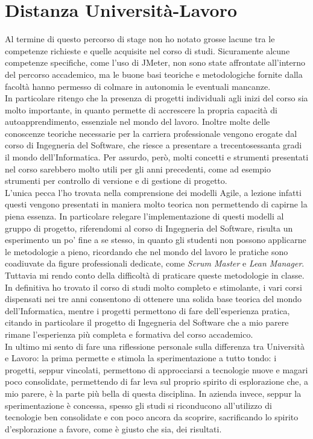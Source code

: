 \section{Distanza Università-Lavoro}
Al termine di questo percorso di stage non ho notato grosse lacune tra le competenze richieste e quelle acquisite nel corso di studi. Sicuramente alcune competenze specifiche, come l'uso di JMeter, non sono state affrontate all'interno del percorso accademico, ma le buone basi teoriche e metodologiche fornite dalla facoltà hanno permesso di colmare in autonomia le eventuali mancanze.\\
In particolare ritengo che la presenza di progetti individuali agli inizi del corso sia molto importante, in quanto permette di accrescere la propria capacità di autoapprendimento, essenziale nel mondo del lavoro. Inoltre molte delle conoscenze teoriche necessarie per la carriera professionale vengono erogate dal corso di Ingegneria del Software, che riesce a presentare a trecentosessanta gradi il mondo dell'Informatica. Per assurdo, però, molti concetti e strumenti presentati nel corso sarebbero molto utili per gli anni precedenti, come ad esempio strumenti per controllo di versione e di gestione di progetto. \\
L'unica pecca l'ho trovata nella comprensione dei modelli Agile, a lezione infatti questi vengono presentati in maniera molto teorica non permettendo di capirne la piena essenza. In particolare relegare l'implementazione di questi modelli al gruppo di progetto, riferendomi al corso di Ingegneria del Software, risulta un esperimento un po' fine a se stesso, in quanto gli studenti non possono applicarne le metodologie a pieno, ricordando che nel mondo del lavoro le pratiche sono coadiuvate da figure professionali dedicate, come \textit{Scrum Master} e \textit{Lean Manager}. Tuttavia mi rendo conto della difficoltà di praticare queste metodologie in classe.\\
In definitiva ho trovato il corso di studi molto completo e stimolante, i vari corsi dispensati nei tre anni consentono di ottenere una solida base teorica del mondo dell'Informatica, mentre i progetti permettono di fare dell'esperienza pratica, citando in particolare il progetto di Ingegneria del Software che a mio parere rimane l'esperienza più completa e formativa del corso accademico.\\
In ultimo mi sento di fare una riflessione personale sulla differenza tra Università e Lavoro: la prima permette e stimola la sperimentazione a tutto tondo: i progetti, seppur vincolati, permettono di approcciarsi a tecnologie nuove e magari poco consolidate, permettendo di far leva sul proprio spirito di esplorazione che, a mio parere, è la parte più bella di questa disciplina. In azienda invece, seppur la sperimentazione è concessa, spesso gli studi si riconducono all'utilizzo di tecnologie ben consolidate e con poco ancora da scoprire, sacrificando lo spirito d'esplorazione a favore, come è giusto che sia, dei risultati. 